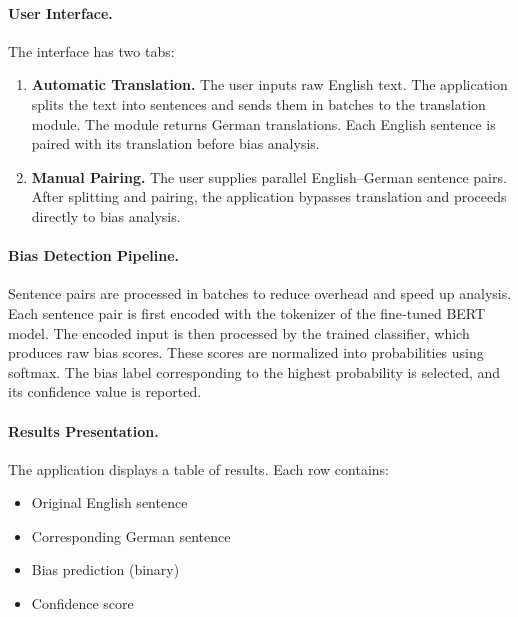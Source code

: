 \paragraph{User Interface.} 
The interface has two tabs:
\begin{enumerate}
  \item \textbf{Automatic Translation.} The user inputs raw English text. The application splits the text into sentences and sends them in batches to the translation module. The module returns German translations. Each English sentence is paired with its translation before bias analysis.
  \item \textbf{Manual Pairing.} The user supplies parallel English–German sentence pairs. After splitting and pairing, the application bypasses translation and proceeds directly to bias analysis.
\end{enumerate}

\paragraph{Bias Detection Pipeline.} 
Sentence pairs are processed in batches to reduce overhead and speed up analysis. Each sentence pair is first encoded with the tokenizer of the fine‑tuned BERT model. The encoded input is then processed by the trained classifier, which produces raw bias scores. These scores are normalized into probabilities using softmax. The bias label corresponding to the highest probability is selected, and its confidence value is reported.

\paragraph{Results Presentation.} 
The application displays a table of results. Each row contains:
\begin{itemize}
  \item Original English sentence
  \item Corresponding German sentence
  \item Bias prediction (binary)
  \item Confidence score
\end{itemize}

